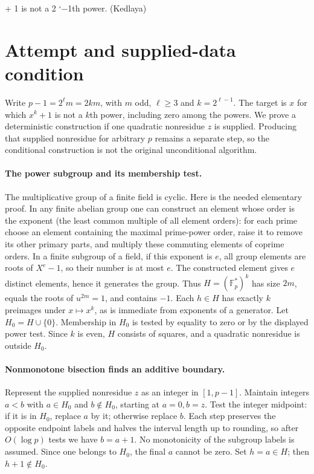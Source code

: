 \documentclass[11pt]{article}
\begin{document}
+ 1 is not a 2 `−1th power. (Kedlaya)

\section{Attempt and supplied-data condition}
Write $p-1=2^\ell m=2km$, with $m$ odd, $\ell\ge3$ and
$k=2^{\ell-1}$. The target is $x$ for which $x^k+1$ is not a
$k$th power, including zero among the powers. We prove a deterministic
construction if one quadratic nonresidue $z$ is supplied. Producing
that supplied nonresidue for arbitrary $p$ remains a separate step,
so the conditional construction is not the original unconditional
algorithm.

\paragraph{The power subgroup and its membership test.}
The multiplicative group of a finite field is cyclic. Here is the
needed elementary proof. In any finite abelian group one can construct
an element whose order is the exponent (the least common multiple of
all element orders): for each prime choose an element containing the
maximal prime-power order, raise it to remove its other primary parts,
and multiply these commuting elements of coprime orders. In a finite
subgroup of a field, if this exponent is $e$, all group elements are
roots of $X^e-1$, so their number is at most $e$. The constructed
element gives $e$ distinct elements, hence it generates the group.
Thus
$H=(\mathbb F_p^*)^k$ has size $2m$, equals the roots of
$u^{2m}=1$, and contains $-1$. Each $h\in H$ has exactly $k$
preimages under $x\mapsto x^k$, as is immediate from exponents of
a generator. Let $H_0=H\cup\{0\}$. Membership in $H_0$ is tested
by equality to zero or by the displayed power test. Since $k$ is even,
$H$ consists of squares, and a quadratic nonresidue is outside $H_0$.

\paragraph{Nonmonotone bisection finds an additive boundary.}
Represent the supplied nonresidue $z$ as an integer in $[1,p-1]$.
Maintain integers $a<b$ with $a\in H_0$ and $b\notin H_0$, starting
at $a=0,b=z$. Test the integer midpoint: if it is in $H_0$, replace
$a$ by it; otherwise replace $b$. Each step preserves the opposite
endpoint labels and halves the interval length up to rounding, so after
$O(\log p)$ tests we have $b=a+1$. No monotonicity of the subgroup
labels is assumed. Since one belongs to $H_0$, the final $a$ cannot
be zero. Set $h=a\in H$; then $h+1\notin H_0$.
\end{document}
